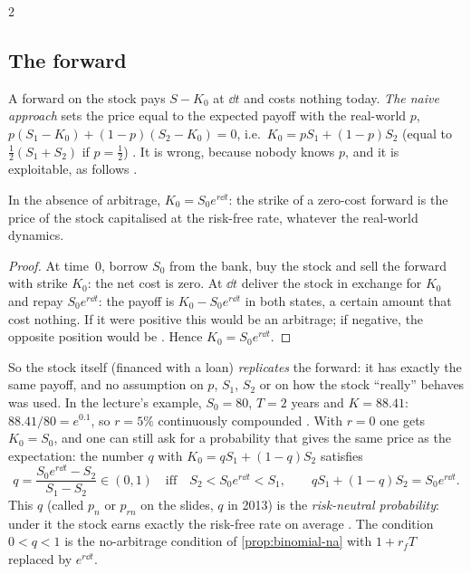 \begin{paracol}{2}
\subsection{The forward}\label{ch15:sec-fwd1}
A forward on the stock pays $S-K_0$ at $\dd t$ and costs nothing today. \emph{The naive approach} sets the price
equal to the expected payoff with the real-world $p$,
$p(S_1-K_0)+(1-p)(S_2-K_0)=0$, i.e.\ $K_0=pS_1+(1-p)S_2$ (equal to $\frac12(S_1+S_2)$ if $p=\frac12$)
. It is wrong, because nobody knows $p$, and it is exploitable, as follows
.

\begin{proposition}\label{ch15:prop-fwd}
In the absence of arbitrage, $K_0=S_0e^{r\dd t}$: the strike of a zero-cost forward is the price of the stock capitalised at the
risk-free rate, whatever the real-world dynamics.
\end{proposition}
\begin{proof}
At time~$0$, borrow $S_0$ from the bank, buy the stock and sell the forward with strike $K_0$: the net cost is zero. At $\dd t$ deliver
the stock in exchange for $K_0$ and repay $S_0e^{r\dd t}$: the payoff is $K_0-S_0e^{r\dd t}$ in both states, a certain
amount that cost nothing. If it were positive this would be an arbitrage; if negative, the opposite position would
be . Hence $K_0=S_0e^{r\dd t}$.
\end{proof}
So the stock itself (financed with a loan) \emph{replicates} the forward: it has exactly the same payoff, and no assumption on $p$, $S_1$, $S_2$
or on how the stock ``really'' behaves was used. In the lecture's example, $S_0=80$, $T=2$ years and $K=88.41$: $88.41/80=e^{0.1}$, so $r=5\%$
continuously compounded . With $r=0$ one gets $K_0=S_0$, and one can still ask for a probability that gives the
same price as the expectation: the number $q$ with $K_0=qS_1+(1-q)S_2$ satisfies
\begin{equation}\label{ch15:eq-q}
  q=\frac{S_0e^{r\dd t}-S_2}{S_1-S_2}\in(0,1)\quad\text{iff}\quad S_2<S_0e^{r\dd t}<S_1,\qquad
  qS_1+(1-q)S_2=S_0e^{r\dd t}.
\end{equation}
This $q$ (called $p_n$ or $p_{rn}$ on the slides, $q$ in 2013) is the \emph{risk-neutral probability}: under it the stock earns exactly the
risk-free rate on average . The condition $0<q<1$ is the no-arbitrage condition of \cref{prop:binomial-na}
with $1+r_fT$ replaced by $e^{r\dd t}$.


\end{paracol}
